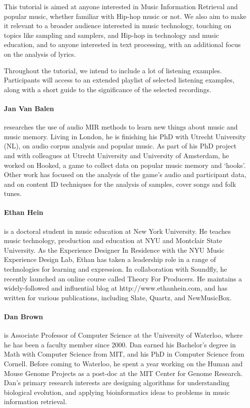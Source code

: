 {This tutorial is aimed at anyone interested in Music Information Retrieval and popular music, whether familiar with Hip-hop music or not. We also aim to make it relevant to a broader audience interested in music technology, touching on topics like sampling and samplers, and Hip-hop in technology and music education, and to anyone interested in text processing, with an additional focus on the analysis of lyrics.

Throughout the tutorial, we intend to include a lot of listening examples. Participants will access to an extended playlist of selected listening examples, along with a short guide to the significance of the selected recordings.}{\paragraph{Jan Van Balen} researches the use of audio MIR methods to learn new things about music and music memory. Living in London, he is finishing his PhD with Utrecht University (NL), on audio corpus analysis and popular music. As part of his PhD project and with colleagues at Utrecht University and University of Amsterdam, he worked on Hooked, a game to collect data on popular music memory and ‘hooks’. Other work has focused on the analysis of the game’s audio and participant data, and on content ID techniques for the analysis of samples, cover songs and folk tunes.

\paragraph{Ethan Hein} is a doctoral student in music education at New York University. He teaches music technology, production and education at NYU and Montclair State University. As the Experience Designer In Residence with the NYU Music Experience Design Lab, Ethan has taken a leadership role in a range of technologies for learning and expression. In collaboration with Soundfly, he recently launched an online course called Theory For Producers. He maintains a widely-followed and influential blog at http://www.ethanhein.com, and has written for various publications, including Slate, Quartz, and NewMusicBox.

\paragraph{Dan Brown} is Associate Professor of Computer Science at the University of Waterloo, where he has been a faculty member since 2000. Dan earned his Bachelor’s degree in Math with Computer Science from MIT, and his PhD in Computer Science from Cornell. Before coming to Waterloo, he spent a year working on the Human and Mouse Genome Projects as a post-doc at the MIT Center for Genome Research. Dan’s primary research interests are designing algorithms for understanding biological evolution, and applying bioinformatics ideas to problems in music information retrieval.}
